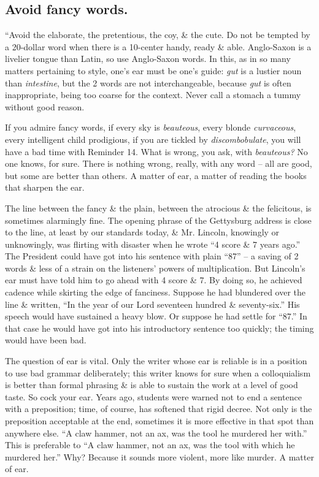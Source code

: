 \documentclass{article}
\numberwithin{equation}{section}
\begin{document}

\subsection{Avoid fancy words.}
``Avoid the elaborate, the pretentious, the coy, \& the cute. Do not be tempted by a 20-dollar word when there is a 10-center handy, ready \& able. Anglo-Saxon is a livelier tongue than Latin, so use Anglo-Saxon words. In this, as in so many matters pertaining to style, one's ear must be one's guide: \textit{gut} is a lustier noun than \textit{intestine}, but the 2 words are not interchangeable, because \textit{gut} is often inappropriate, being too coarse for the context. Never call a stomach a tummy without good reason.

If you admire fancy words, if every sky is \textit{beauteous}, every blonde \textit{curvaceous}, every intelligent child prodigious, if you are tickled by \textit{discombobulate}, you will have a bad time with Reminder 14. What is wrong, you ask, with \textit{beauteous?} No one knows, for sure. There is nothing wrong, really, with any word -- all are good, but some are better than others. A matter of ear, a matter of reading the books that sharpen the ear.

The line between the fancy \& the plain, between the atrocious \& the felicitous, is sometimes alarmingly fine. The opening phrase of the Gettysburg address is close to the line, at least by our standards today, \& Mr. Lincoln, knowingly or unknowingly, was flirting with disaster when he wrote ``4 score \& 7 years ago.'' The President could have got into his sentence with plain ``87'' -- a saving of 2 words \& less of a strain on the listeners' powers of multiplication. But Lincoln's ear must have told him to go ahead with 4 score \& 7. By doing so, he achieved cadence while skirting the edge of fanciness. Suppose he had blundered over the line \& written, ``In the year of our Lord seventeen hundred \& seventy-six.'' His speech would have sustained a heavy blow. Or suppose he had settle for ``87.'' In that case he would have got into his introductory sentence too quickly; the timing would have been bad.

The question of ear is vital. Only the writer whose ear is reliable is in a position to use bad grammar deliberately; this writer knows for sure when a colloquialism is better than formal phrasing \& is able to sustain the work at a level of good taste. So cock your ear. Years ago, students were warned not to end a sentence with a preposition; time, of course, has softened that rigid decree. Not only is the preposition acceptable at the end, sometimes it is more effective in that spot than anywhere else. ``A claw hammer, not an ax, was the tool he murdered her with.'' This is preferable to ``A claw hammer, not an ax, was the tool with which he murdered her.'' Why? Because it sounds more violent, more like murder. A matter of ear.
\end{document}
